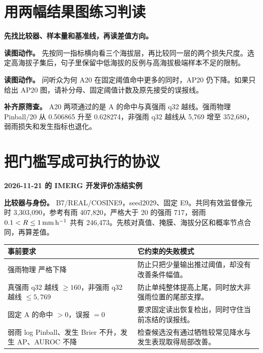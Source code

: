 \clearpage
\hypertarget{case-figures}{}
\section*{用两幅结果图练习判读}
{\color{accent}\bfseries 先找比较器、样本量和基准线，再读差值方向。}\par

\textbf{读图动作。} 先按同一指标横向看三个海拔层，再比较同一层的两个损失尺度。选定高海拔子集后，句子里保留中低海拔的反例与高海拔极端样本不足的限制。\par

\textbf{读图动作。} 问听众为何 A20 在固定阈值命中更多的同时，AP20 仍下降。如果只给出 AP20 图，请补分母、固定阈值计数及原先接受的误报线。\par
\textbf{补齐原筛查。} A20 两项通过的是 A 的命中与真强雨 q32 越线。强雨物理 Pinball/20 从 0.506865 升至 0.628274，非强雨 q32 越线从 5,769 增至 352,680，弱雨损失和发生指标也退化。\par



\clearpage
\hypertarget{freeze}{}
\section*{把门槛写成可执行的协议}
\label{p-freeze}
{\color{accent}\bfseries 2026-11-21 的 IMERG 开发评价冻结实例}\par

\textbf{比较器与身份。} B7/REAL/COSINE9，seed2029、固定 E9。共同有效监督像元时 3,303,090，参考有雨 407,820，严格大于 20 的强雨 717，弱雨 \(0.1<R\le1\,\mathrm{mm\,h^{-1}}\) 共有 246,473。先核对真值、掩膜、海拔分区和概率节点合同，再算差值。

\begin{tabularx}{\linewidth}{@{}L L@{}}
\toprule
事前要求 & 它约束的失败模式 \\
\midrule
强雨物理  严格下降 & 防止只把少量输出推过阈值，却没有改善条件幅值。\\
真强雨 q32 越线 \(\ge160\)，非强雨 q32 越线 \(\le5{,}769\) & 防止单纯整体提高上尾，同时放大非强雨位置的尾部支撑。\\
固定 A 的命中 \(>0\)，误报 \(=0\) & 要求固定读出恢复检出，同时守住当前冻结的误报线。\\
弱雨 log Pinball、发生 Brier 不升，发生 AP、AUROC 不降 & 检查候选没有通过牺牲较常见降水与发生表现取得局部改善。\\
\bottomrule
\end{tabularx}


